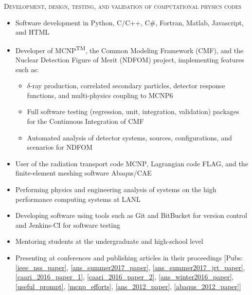 \begin{center}
	\begin{minipage}{0.99\textwidth}
		\begin{center}
			\textsc{\Large Development, design, testing, and validation of computational physics codes} \vspace{2mm}
		\end{center}
	\end{minipage}
\end{center}
\begin{minipage}{\textwidth}
    \begin{center}
	\begin{itemize}
	    \item Software development in Python, C/C++, C\#, Fortran, Matlab, Javascript, and HTML
	    \item Developer of \textsc{MCNP}\textsuperscript{TM}, the Common Modeling Framework (\textsc{CMF}), and the Nuclear Detection Figure of Merit (\textsc{NDFOM}) project, implementing features such as: \vspace{2mm}
	    \begin{itemize}
  	    \item $\delta$-ray production, correlated secondary particles, detector response functions, and multi-physics coupling to \textsc{MCNP6} 
	    \item Full software testing (regression, unit, integration, validation) packages for the Continuous Integration of \textsc{CMF}
	    \item Automated analysis of detector systems, sources, configurations, and scenarios for \textsc{NDFOM}
	\end{itemize}

	\item User of the radiation transport code \textsc{MCNP}, Lagrangian code \textsc{FLAG}, and the finite-element meshing software Abaqus/CAE
	\item Performing physics and engineering analysis of systems on the high performance computing systems at LANL
	\item Developing software using tools such as Git and BitBucket for version control and Jenkins-CI for software testing
	\item Mentoring students at the undergraduate and high-school level
	\item Presenting at conferences and publishing articles in their proceedings [Pubs: \ref{ieee_nss_paper}, \ref{ans_summer2017_paper}, \ref{ans_summer2017_jrt_paper}, \ref{caari_2016_paper_1}, \ref{caari_2016_paper_2}, \ref{ans_winter2016_paper}, \ref{useful_prompt}, \ref{mcnp_efforts}, \ref{ans_2012_paper}, \ref{abaqus_2012_paper}]
	\end{itemize}
    \end{center}
\end{minipage}

